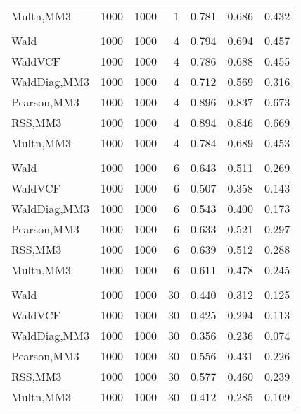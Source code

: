 \documentclass[
]{article}
\begin{document}
\begin{table}[H]
{\begin{tabular}[t]{lrrrrrr}
\hspace{1em}Multn,MM3 & 1000 & 1000 & 1 & 0.781 & 0.686 & 0.432\\
\addlinespace[0.3em]
\multicolumn{7}{l}{\textbf{1F 15V}}\\
\hspace{1em}Wald & 1000 & 1000 & 4 & 0.794 & 0.694 & 0.457\\
\hspace{1em}WaldVCF & 1000 & 1000 & 4 & 0.786 & 0.688 & 0.455\\
\hspace{1em}WaldDiag,MM3 & 1000 & 1000 & 4 & 0.712 & 0.569 & 0.316\\
\hspace{1em}Pearson,MM3 & 1000 & 1000 & 4 & 0.896 & 0.837 & 0.673\\
\hspace{1em}RSS,MM3 & 1000 & 1000 & 4 & 0.894 & 0.846 & 0.669\\
\hspace{1em}Multn,MM3 & 1000 & 1000 & 4 & 0.784 & 0.689 & 0.453\\
\addlinespace[0.3em]
\multicolumn{7}{l}{\textbf{2F 10V}}\\
\hspace{1em}Wald & 1000 & 1000 & 6 & 0.643 & 0.511 & 0.269\\
\hspace{1em}WaldVCF & 1000 & 1000 & 6 & 0.507 & 0.358 & 0.143\\
\hspace{1em}WaldDiag,MM3 & 1000 & 1000 & 6 & 0.543 & 0.400 & 0.173\\
\hspace{1em}Pearson,MM3 & 1000 & 1000 & 6 & 0.633 & 0.521 & 0.297\\
\hspace{1em}RSS,MM3 & 1000 & 1000 & 6 & 0.639 & 0.512 & 0.288\\
\hspace{1em}Multn,MM3 & 1000 & 1000 & 6 & 0.611 & 0.478 & 0.245\\
\addlinespace[0.3em]
\multicolumn{7}{l}{\textbf{3F 15V}}\\
\hspace{1em}Wald & 1000 & 1000 & 30 & 0.440 & 0.312 & 0.125\\
\hspace{1em}WaldVCF & 1000 & 1000 & 30 & 0.425 & 0.294 & 0.113\\
\hspace{1em}WaldDiag,MM3 & 1000 & 1000 & 30 & 0.356 & 0.236 & 0.074\\
\hspace{1em}Pearson,MM3 & 1000 & 1000 & 30 & 0.556 & 0.431 & 0.226\\
\hspace{1em}RSS,MM3 & 1000 & 1000 & 30 & 0.577 & 0.460 & 0.239\\
\hspace{1em}Multn,MM3 & 1000 & 1000 & 30 & 0.412 & 0.285 & 0.109\\
\bottomrule
\end{tabular}}
\endgroup{}
\end{table}
\end{document}
